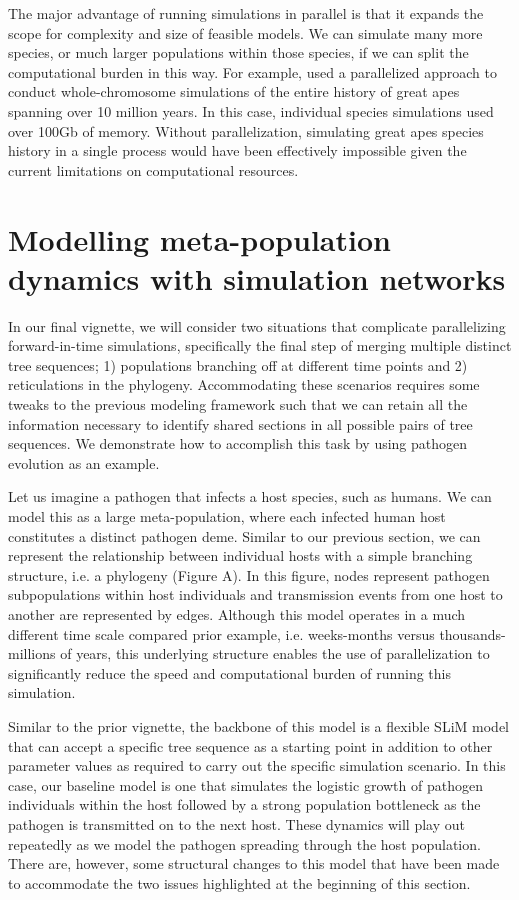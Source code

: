 \documentclass[12pt]{article}
\begin{document}
The major advantage of running simulations in parallel is that it expands the scope for complexity and size of feasible models. We can simulate many more species, or much larger
populations within those species, if we can split the computational burden in this way. For example, \citet{rodrigues2024shared} used a parallelized approach to conduct
whole-chromosome simulations of the entire history of great apes spanning over 10 million years. In this case, individual species simulations used over 100Gb of memory. Without
parallelization, simulating great apes species history in a single process would have been effectively impossible given the current limitations on computational resources.

\section*{Modelling meta-population dynamics with simulation networks}

In our final vignette, we will consider two situations that complicate parallelizing forward-in-time simulations, specifically the final step of merging multiple distinct tree sequences;
1) populations branching off at different time points and 2) reticulations in the phylogeny. Accommodating these scenarios requires some tweaks to the previous modeling
framework such that we can retain all the information necessary to identify shared sections in all possible pairs of tree sequences. We demonstrate how to accomplish this task
by using pathogen evolution as an example.

Let us imagine a pathogen that infects a host species, such as humans. We can model this as a large meta-population, where each infected human host constitutes a distinct
pathogen deme. Similar to our previous section, we can represent the relationship between individual hosts with a simple branching structure, i.e. a phylogeny (Figure A). In %
this figure, nodes represent pathogen subpopulations within host individuals and transmission events from one host to another are represented by edges. Although this model
operates in a much different time scale compared prior example, i.e. weeks-months versus thousands-millions of years, this underlying structure enables the use of parallelization
to significantly reduce the speed and computational burden of running this simulation.

Similar to the prior vignette, the backbone of this model is a flexible SLiM model that can accept a specific tree sequence as a starting point in addition to other
parameter values as required to carry out the specific simulation scenario. In this case, our baseline model is one that simulates the logistic growth of pathogen individuals
within the host followed by a strong population bottleneck as the pathogen is transmitted on to the next host. These dynamics will play out repeatedly as we model the pathogen
spreading through the host population. There are, however, some structural changes to this model that have been made to accommodate the two issues highlighted at the
beginning of this section.
\end{document}
